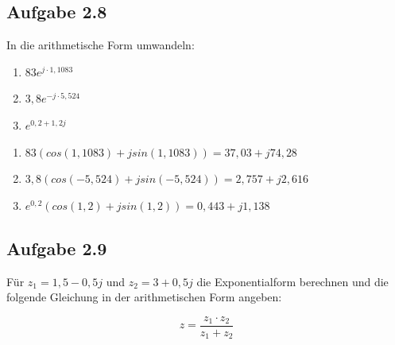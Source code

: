 \documentclass[
  ngerman,
  letterpaper,
]{scrbook}
\begin{document}
\subsection{Aufgabe 2.8}\label{aufgabe-2.8}

In die arithmetische Form umwandeln:

\begin{enumerate}
\def\labelenumi{\alph{enumi})}
\item
  \(83 e^{j \cdot 1,1083}\)
\item
  \(3,8 e^{-j \cdot 5,524}\)
\item
  \(e^{0,2 + 1,2j}\)
\end{enumerate}

\begin{tcolorbox}[enhanced jigsaw, titlerule=0mm, rightrule=.15mm, toprule=.15mm, colback=white, toptitle=1mm, bottomrule=.15mm, coltitle=black, leftrule=.75mm, arc=.35mm, colbacktitle=quarto-callout-caution-color!10!white, opacityback=0, bottomtitle=1mm, colframe=quarto-callout-caution-color-frame, opacitybacktitle=0.6, breakable, title=\textcolor{quarto-callout-caution-color}{\faFire}\hspace{0.5em}{Lösung 2.8}, left=2mm]

\begin{enumerate}
\def\labelenumi{\alph{enumi})}
\item
  \(83(cos(1,1083) + j sin(1,1083)) = 37,03 + j74,28\)
\item
  \(3,8(cos(-5,524) + j sin(-5,524)) = 2,757 + j2,616\)
\item
  \(e^{0,2}(cos(1,2) + j sin(1,2)) = 0,443 + j1,138\)
\end{enumerate}

\end{tcolorbox}

\subsection{Aufgabe 2.9}\label{aufgabe-2.9}

Für \(z_1 = 1,5 - 0,5j\) und \(z_2 = 3 + 0,5j\) die Exponentialform
berechnen und die folgende Gleichung in der arithmetischen Form angeben:

\[z = \frac{z_1 \cdot z_2}{z_1 + z_2}\]
\end{document}
